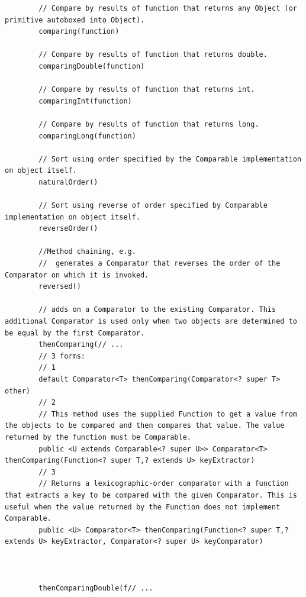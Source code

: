 \documentclass{scrartcl}
\begin{document}
    \begin{lstlisting}
        // Compare by results of function that returns any Object (or primitive autoboxed into Object).
        comparing(function)

        // Compare by results of function that returns double.
        comparingDouble(function)

        // Compare by results of function that returns int.
        comparingInt(function)

        // Compare by results of function that returns long.
        comparingLong(function)

        // Sort using order specified by the Comparable implementation on object itself.
        naturalOrder()

        // Sort using reverse of order specified by Comparable implementation on object itself.
        reverseOrder()

        //Method chaining, e.g.
        //  generates a Comparator that reverses the order of the Comparator on which it is invoked.
        reversed()

        // adds on a Comparator to the existing Comparator. This additional Comparator is used only when two objects are determined to be equal by the first Comparator.
        thenComparing(// ...
        // 3 forms:
        // 1
        default Comparator<T> thenComparing(Comparator<? super T> other)
        // 2
        // This method uses the supplied Function to get a value from the objects to be compared and then compares that value. The value returned by the function must be Comparable.
        public <U extends Comparable<? super U>> Comparator<T> thenComparing(Function<? super T,? extends U> keyExtractor)
        // 3
        // Returns a lexicographic-order comparator with a function that extracts a key to be compared with the given Comparator. This is useful when the value returned by the Function does not implement Comparable.
        public <U> Comparator<T> thenComparing(Function<? super T,? extends U> keyExtractor, Comparator<? super U> keyComparator)



        thenComparingDouble(f// ...

    \end{lstlisting}

    \begin{lstlisting}
    \end{lstlisting}


    \begin{lstlisting}
    \end{lstlisting}
\end{document}

